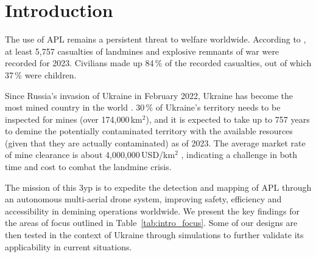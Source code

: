 \section{Introduction} \label{introduction}

The use of \gls{APL} remains a persistent threat to welfare worldwide. According to \cite{icbl2024landmine}, at least 5,757 casualties of landmines and explosive remnants of war were recorded for 2023. Civilians made up 84\,\% of the recorded casualties, out of which 37\,\% were children. 

Since Russia's invasion of Ukraine in February 2022, Ukraine has become the most mined country in the world \cite{globsec2024ukraine}. 30\,\% of Ukraine's territory needs to be inspected for mines (over 174,000\,km$^2$), and it is expected to take up to 757 years to demine the potentially contaminated territory with the available resources (given that they are actually contaminated) as of 2023. The average market rate of mine clearance is about 4,000,000\,USD/km$^2$ \cite{globsec2023ukraine}, indicating a challenge in both time and cost to combat the landmine crisis. 

The mission of this \gls{3yp} is to expedite the detection and mapping of \gls{APL} through an autonomous multi-aerial drone system, improving safety, efficiency and accessibility in demining operations worldwide. We present the key findings for the areas of focus outlined in Table~\ref{tab:intro_focus}. Some of our designs are then tested in the context of Ukraine through simulations to further validate its applicability in current situations.  


